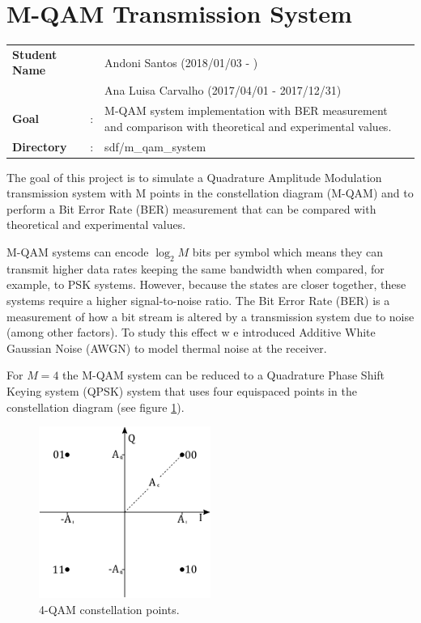 \clearpage
\section{M-QAM Transmission System}

\begin{refsection}

\begin{tcolorbox}	
	\begin{tabular}{p{2.75cm} p{0.2cm} p{10.5cm}}
		\textbf{Student Name}  & & Andoni Santos (2018/01/03 - )\\
							   & & Ana Luisa Carvalho (2017/04/01 - 2017/12/31) \\
		\textbf{Goal}          &:& M-QAM system implementation with BER measurement and comparison with theoretical and experimental values.\\
		\textbf{Directory} &:& sdf/m\_qam\_system
	\end{tabular}
\end{tcolorbox}

The goal of this project is to simulate a Quadrature Amplitude Modulation transmission system with M points in the constellation diagram (M-QAM) and to perform a Bit Error Rate (BER) measurement that can be compared with theoretical and experimental values.

M-QAM systems can encode $\log_2 M$ bits per symbol which means they can transmit higher data rates keeping the same bandwidth when compared, for example, to PSK systems. However, because the states are closer together, these systems require a higher signal-to-noise ratio.
The Bit Error Rate (BER) is a measurement of how a bit stream is altered by a transmission system due to noise (among other factors). To study this effect w	e introduced Additive White Gaussian Noise (AWGN) to model thermal noise at the receiver.

For $M=4$ the M-QAM system can be reduced to a Quadrature Phase Shift Keying system (QPSK) system that uses four equispaced points in the constellation diagram (see figure \ref{fig:const}).

\begin{figure}[h]
	\centering
	\includegraphics[width=0.5\textwidth]{./sdf/m_qam_system/figures/constellation.pdf}
	\caption{4-QAM constellation points.}
	\label{fig:const}
\end{figure}


\end{refsection}
